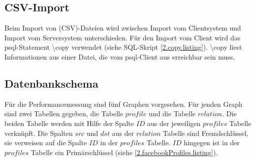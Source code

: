 \subsection{CSV-Import}
Beim Import von (CSV)-Dateien wird zwischen Import vom Clientsystem und  Import vom Serversystem unterschieden.
Für den Import vom Client wird das psql-Statement \textbackslash copy verwendet (siehe SQL-Skript \ref{2.copy.listing}).
\textbackslash copy liest Informationen aus einer Datei,
die vom psql-Client aus erreichbar sein muss. \cite{postgres2018Copy}

\subsection{Datenbankschema}
Für die Performancemessung sind fünf Graphen vorgesehen.
Für jenden Graph sind zwei Tabellen gegeben, die Tabelle $profile$ und die Tabelle $relation$.
Die beiden Tabelle werden mit Hilfe der Spalte $ID$ aus der jeweiligen $profiles$ Tabelle verknüpft.
Die Spalten $src$ und $dst$ aus der $relation$ Tabelle sind Fremdschlüssel, sie verweisen auf die Spalte $ID$ in der $profiles$ Tabelle.
$ID$ hingegen ist in der $profiles$ Tabelle ein Primärschlüssel (siehe \ref{2.facebookProfiles.listing}).

